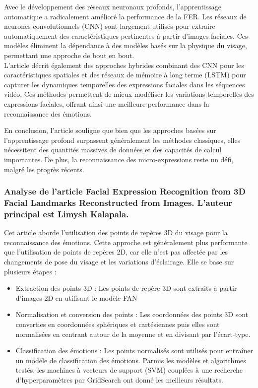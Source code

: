 \documentclass{rapport}
\begin{document}
Avec le développement des réseaux neuronaux profonds, l'apprentissage automatique 
a radicalement amélioré la performance de la FER. Les réseaux de neurones convolutionnels 
(CNN) sont largement utilisés pour extraire automatiquement des caractéristiques pertinentes 
à partir d'images faciales. Ces modèles éliminent la dépendance à des modèles 
basés sur la physique du visage, permettant une approche de bout en bout.
\\L'article décrit également des approches hybrides combinant des CNN pour les 
caractéristiques spatiales et des réseaux de mémoire à long terme (LSTM) pour 
capturer les dynamiques temporelles des expressions faciales dans les séquences vidéo. 
Ces méthodes permettent de mieux modéliser les variations temporelles des expressions 
faciales, offrant ainsi une meilleure performance dans la reconnaissance des émotions.

En conclusion, l'article souligne que bien que les approches basées sur 
l'apprentissage profond surpassent généralement les méthodes classiques, elles 
nécessitent des quantités massives de données et des capacités de calcul 
importantes. De plus, la reconnaissance des micro-expressions reste un défi, 
malgré les progrès récents.

\subsubsection{Analyse de l'article \cite{kalapalaFacialExpressionRecognition2020} Facial Expression Recognition from 3D Facial  Landmarks Reconstructed from Images. L'auteur principal est Limysh Kalapala.}

Cet article aborde l'utilisation des points de repères 3D du visage pour la reconnaissance des émotions.
Cette approche est généralement plus performante que l'utilisation de points de repères 2D, car elle n'est pas
affectée par les changements de pose du visage et les variations d'éclairage. Elle se base sur plusieurs étapes :\\
\begin{itemize}
    \item Extraction des points 3D : Les points de repère 3D sont extraits à partir d'images 2D en utilisant le modèle FAN
    \item Normalisation et conversion des points : Les coordonnées des points 3D sont converties en coordonnées sphériques et cartésiennes
          puis elles sont normalisées en centrant autour de la moyenne et en divisant par l'écart-type.
    \item Classification des émotions : Les points normalisés sont utilisés pour entraîner un modèle de classification des émotions. Parmis
          les modèles et algorithmes testés, les machines à vecteurs de support (SVM) couplées à une recherche d'hyperparamètres par GridSearch
          ont donné les meilleurs résultats.\\
\end{itemize}
\end{document}
